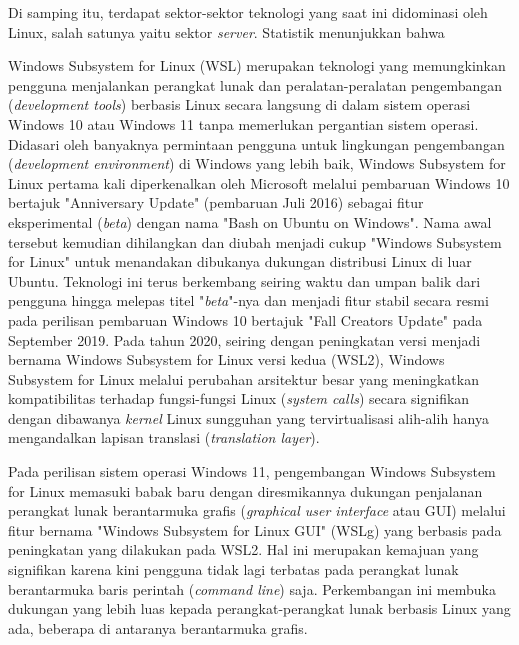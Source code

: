 Di samping itu, terdapat sektor-sektor teknologi yang saat ini didominasi oleh Linux, salah satunya yaitu sektor \textit{server}. Statistik menunjukkan bahwa

Windows Subsystem for Linux (WSL) merupakan teknologi yang memungkinkan pengguna menjalankan perangkat lunak dan peralatan-peralatan pengembangan (\textit{development tools}) berbasis Linux secara langsung di dalam sistem operasi Windows 10 atau Windows 11 tanpa memerlukan pergantian sistem operasi. Didasari oleh banyaknya permintaan pengguna untuk lingkungan pengembangan (\textit{development environment}) di Windows yang lebih baik, Windows Subsystem for Linux pertama kali diperkenalkan oleh Microsoft melalui pembaruan Windows 10 bertajuk "Anniversary Update" (pembaruan Juli 2016) sebagai fitur eksperimental (\textit{beta}) dengan nama "Bash on Ubuntu on Windows". Nama awal tersebut kemudian dihilangkan dan diubah menjadi cukup "Windows Subsystem for Linux" untuk menandakan dibukanya dukungan distribusi Linux di luar Ubuntu. Teknologi ini terus berkembang seiring waktu dan umpan balik dari pengguna hingga melepas titel "\textit{beta}"-nya dan menjadi fitur stabil secara resmi pada perilisan pembaruan Windows 10 bertajuk "Fall Creators Update" pada September 2019. Pada tahun 2020, seiring dengan peningkatan versi menjadi bernama Windows Subsystem for Linux versi kedua (WSL2), Windows Subsystem for Linux melalui perubahan arsitektur besar yang meningkatkan kompatibilitas terhadap fungsi-fungsi Linux (\textit{system calls}) secara signifikan dengan dibawanya \textit{kernel} Linux sungguhan yang tervirtualisasi alih-alih hanya mengandalkan lapisan translasi (\textit{translation layer}).

Pada perilisan sistem operasi Windows 11, pengembangan Windows Subsystem for Linux memasuki babak baru dengan diresmikannya dukungan penjalanan perangkat lunak berantarmuka grafis (\textit{graphical user interface} atau GUI) melalui fitur bernama "Windows Subsystem for Linux GUI" (WSLg) yang berbasis pada peningkatan yang dilakukan pada WSL2. Hal ini merupakan kemajuan yang signifikan karena kini pengguna tidak lagi terbatas pada perangkat lunak berantarmuka baris perintah (\textit{command line}) saja. Perkembangan ini membuka dukungan yang lebih luas kepada perangkat-perangkat lunak berbasis Linux yang ada, beberapa di antaranya berantarmuka grafis.

